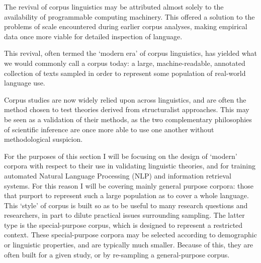 The revival of corpus linguistics may be attributed almost solely to the availability of programmable computing machinery.  This offered a solution to the problems of scale encountered during earlier corpus analyses, making empirical data once more viable for detailed inspection of language.

This revival, often termed the `modern era' of corpus linguistics, has yielded what we would commonly call a corpus today: a large, machine-readable, annotated collection of texts sampled in order to represent some population of real-world language use.

Corpus studies are now widely relied upon across linguistics, and are often the method chosen to test theories derived from structuralist approaches.  This may be seen as a validation of their methods, as the two complementary philosophies of scientific inference are once more able to use one another without methodological suspicion.

For the purposes of this section I will be focusing on the design of `modern' corpora with respect to their use in validating linguistic theories, and for training automated Natural Language Processing (NLP) and information retrieval systems.  For this reason I will be covering mainly general purpose corpora: those that purport to represent such a large population as to cover a whole language.  This `style' of corpus is built so as to be useful to many research questions and researchers, in part to dilute practical issues surrounding sampling.  The latter type is the special-purpose corpus, which is designed to represent a restricted context.  These special-purpose corpora may be selected according to demographic or linguistic properties, and are typically much smaller.  Because of this, they are often built for a given study, or by re-sampling a general-purpose corpus.









